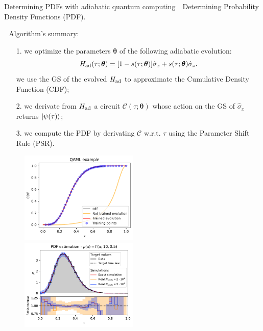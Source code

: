 \documentclass[8pt, xcolor={svgnames}, hyperref={linkcolor=black}]{beamer}
\begin{document}
\begin{frame}{Determining PDFs with adiabatic quantum computing}
\small
\faCrosshairs\,\, Determining Probability Density Functions (PDF).

\faFlash\,\, Algorithm's summary:
\begin{itemize}[noitemsep]
\item[1.] we optimize the parameters $\bm{\theta}$ of the following adiabatic evolution:
\begin{equation} 
H_{\rm ad}(\tau; \bm{\theta}) = [1-s(\tau; \bm{\theta})] \hat{\sigma}_x + s(\tau; \bm{\theta})\hat{\sigma}_z.
\end{equation}
we use the GS of the evolved $H_{\rm ad}$ to approximate the Cumulative
Density Function (CDF);
\item[2.] we derivate from $H_{\rm ad}$ a circuit $\mathcal{C}(\tau; \bm{\theta})$ whose action 
on the GS of $\hat{\sigma}_x$ returns $\ket{\psi(\tau)}$;
\item[3.] we compute the PDF by derivating $\mathcal{C}$ w.r.t. $\tau$ 
using the Parameter Shift Rule (PSR).
\vspace{0.05cm}
\end{itemize}
\begin{figure}  
    \includegraphics[width=0.5\textwidth]{figures/evolution.pdf}%
    \includegraphics[width=0.5\textwidth]{figures/PDF.pdf}
\end{figure}
\end{frame}
\end{document}
